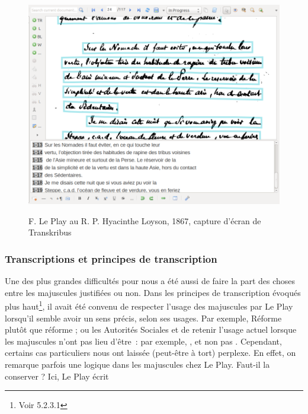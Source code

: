 \begin{figure}[ht]
    \centering
    \caption{F. Le Play au R. P. Hyacinthe Loyson, 1867, capture d'écran de Transkribus}
    \includegraphics[width=16cm]{images/asieTranskribus.png}
    \label{asieTranskribus}
\end{figure}

\subsubsection{Transcriptions et principes de transcription}

Une des plus grandes difficultés pour nous a été aussi de faire la part des choses entre les majuscules justifiées ou non. Dans les principes de transcription évoqués plus haut\footnote{Voir 5.2.3.1}, il avait été convenu de respecter l’usage des majuscules par Le Play lorsqu’il semble avoir un sens précis, selon ses usages. Par exemple, Réforme plutôt que réforme ; ou les Autorités Sociales et de retenir l’usage
actuel lorsque les majuscules n’ont pas lieu d’être~: par exemple, , et non pas .
Cependant, certains cas particuliers nous ont laissée (peut-être à tort) perplexe. En effet, on remarque parfois une logique dans les majuscules chez Le Play. Faut-il la conserver ? Ici, Le Play écrit	 


